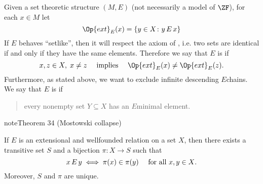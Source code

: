 \documentclass[letterpaper,10pt,english]{jupyterBook}
\begin{document}
\sphinxAtStartPar
Given a set theoretic structure \((M,E)\) (not necessarily a model of \(\ZF\)), for each \(x \in M\) let
\begin{equation*}
	\Op{ext}_E(x) = \{ y \in X \colon y\, E \, x \}
\end{equation*}
\sphinxAtStartPar
If \(E\) behaves “set\sphinxhyphen{}like”, then it will respect the axiom of , i.e. two sets are identical if and only if they have the same elements. Therefore we say that \(E\) is  if
\begin{equation*}
	x,z \in X, \; x\neq z \quad \text{ implies } \quad \Op{ext}_E(x) \neq \Op{ext}_E(z).
\end{equation*}
\sphinxAtStartPar
Furthermore, as stated above, we want to exclude infinite descending \(E\)\sphinxhyphen{}chains. We say that \(E\) is  if
\begin{quote}

\sphinxAtStartPar
every non\sphinxhyphen{}empty set \(Y \subseteq X\) has an \(E\)\sphinxhyphen{}minimal element.
\end{quote}
\label{models:thm-Mostowski-collapse}
\begin{sphinxadmonition}{note}{Theorem 34 (Mostowski collapse)}



\sphinxAtStartPar
If \(E\) is an extensional and well\sphinxhyphen{}founded relation on a set \(X\), then there exists a transitive set \(S\) and a bijection \(\pi: X \to S\) such that
\begin{equation*}
    x \, E \, y \iff \pi(x) \in \pi(y) \quad \text{ for all $ x,y \in X$}.		
\end{equation*}
\sphinxAtStartPar
Moreover, \(S\) and \(\pi\) are unique.
\end{sphinxadmonition}
\end{document}
